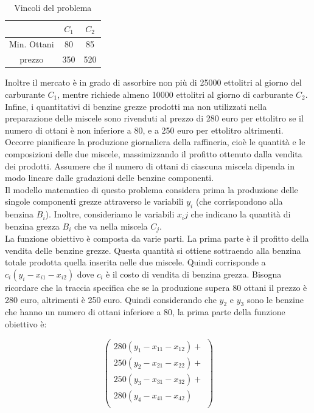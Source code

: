 \documentclass{article}
\begin{document}
\begin{table}
  \center
  \begin{tabular}
  { |c|c|c| }
    \hline
    & $C_1$ & $C_2$ \\
    \hline
    Min. Ottani & 80 & 85 \\ 
    prezzo & 350 & 520 \\
    \hline
  \end{tabular}
  \caption{Vincoli del problema}
  \label{tab:benzine_vincoli}
\end{table}

Inoltre il mercato è in grado di assorbire non più di 25000 ettolitri al giorno
del carburante $C_1$, mentre richiede almeno 10000 ettolitri al giorno di
carburante $C_2$. Infine, i quantitativi di benzine grezze prodotti ma non 
utilizzati nella preparazione delle miscele sono rivenduti al prezzo di 280
euro per ettolitro se il numero di ottani è non inferiore a 80, e a 250 euro 
per ettolitro altrimenti.
Occorre pianificare la produzione giornaliera della raffineria, 
cioè le quantità e le composizioni delle due miscele, massimizzando il
profitto ottenuto dalla vendita dei prodotti. Assumere che il numero di ottani
di ciascuna miscela dipenda in modo lineare dalle gradazioni delle benzine 
componenti.\\

Il modello matematico di questo problema considera prima la produzione delle 
singole componenti grezze attraverso le variabili $y_i$ (che corrispondono alla 
benzina $B_i$). Inoltre, consideriamo le variabili $x_{i}{j}$ che indicano la 
quantità di benzina grezza $B_i$ che va nella miscela $C_j$.\\
La funzione obiettivo è composta da varie parti. La prima parte è il profitto 
della vendita delle benzine grezze. Questa quantità si ottiene sottraendo alla 
benzina totale prodotta quella inserita nelle due miscele. Quindi corrisponde a 
$c_i(y_i - x_{i1} - x_{i2})$ dove $c_i$ è il costo di vendita di benzina grezza.
Bisogna ricordare che la traccia specifica che se la produzione supera 80 ottani 
il prezzo è 280 euro, altrimenti è 250 euro. Quindi considerando che $y_2$ e $y_3$ 
sono le benzine che hanno un numero di ottani inferiore a 80, la prima parte 
della funzione obiettivo è:

\begin{equation*}
 \begin{pmatrix}
   280(y_1 - x_{11} - x_{12})+ \\ 
   250(y_2 - x_{21} -x_{22}) +\\
   250(y_3 - x_{31} -x_{32}) +\\
   280(y_4 - x_{41} -x_{42}) \\
  \end{pmatrix}
\end{equation*}
\end{document}
